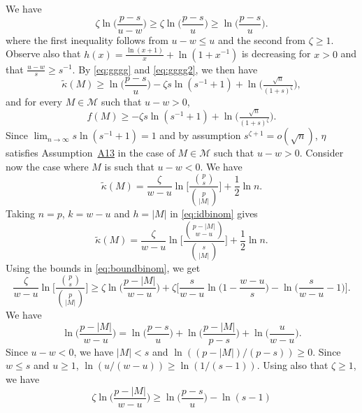 \documentclass[bj,authoryear]{imsart}
\theoremstyle{plain}
\begin{document}
We have
\begin{equation}\label{eq:gggg2}
\zeta\ln\bigg(\frac{p-s}{u-w}\bigg) \geq \zeta\ln\bigg(\frac{p-s}{u}\bigg) \geq \ln\bigg(\frac{p-s}{u}\bigg).\end{equation}
where the first inequality follows from $u-w\leq u$ and the second from $\zeta\geq 1$.
Observe also that $h(x)= \frac{\ln(x+1)}{x}+\ln(1+{x}^{-1})$ is decreasing for $x>0$ and that $\frac{u-w}{s} \geq s^{-1}$. By \eqref{eq:gggg} and \eqref{eq:gggg2}, we then have 
\begin{equation*}
        \tilde{\kappa}(M) \geq \ln\big(\frac{p-s}{u}\big)-\zeta s\ln(s^{-1}+1)+ \ln \big(\tfrac{\sqrt{n}}{(1+s)^{\zeta}}\big),
\end{equation*}
and for every $M\in\mathcal{M}$ such that $u-w>0$,
\begin{equation}\label{eq:lowerboundb1ebic2}
        f(M) \geq -\zeta s\ln(s^{-1}+1)+ \ln \big(\tfrac{\sqrt{n}}{(1+s)^{\zeta}}\big).
\end{equation}
Since $\lim_{n\to\infty}s\ln(s^{-1}+1)=1$ and by assumption $s^{\zeta+1}=o(\sqrt{n})$, $\eta$ satisfies Assumption~\hyperlink{lab:A13}{A13} in the case of $M\in\mathcal{M}$ such that $u-w>0$.
Consider now the case where $M$ is such that $u-w<0$. We have
     \begin{equation*}
        \tilde{\kappa}(M)=\frac{\zeta}{w-u}\ln\bigg[\frac{\binom{p}{s}}{\binom{p}{|M|}}\bigg]+ \frac{1}{2}\ln n.
    \end{equation*}
 Taking $n=p$, $k=w-u$ and $h=|M|$ in \eqref{eq:idbinom} gives
     \begin{equation}\label{eq:identitybinom2}
     \tilde{\kappa}(M)=\frac{\zeta}{w-u}\ln\bigg[\frac{\binom{p - |M|}{w-u}}{\binom{s}{|M|}}\bigg]+ \frac{1}{2}\ln n.
    \end{equation}
Using the bounds in \eqref{eq:boundbinom}, we get
\begin{equation}\label{eq:PVnk}
    \frac{\zeta}{w-u}\ln\bigg[\frac{\binom{p}{s}}{\binom{p}{|M|}}\bigg] \geq \zeta\ln\bigg(\frac{p-|M|}{w-u}\bigg)+\zeta\bigg[\frac{s}{w-u}\ln\bigg(1-\frac{w-u}{s}\bigg) -\ln\bigg(\frac{s}{w-u}-1\bigg) \bigg].
\end{equation}
We have
$$\ln\bigg(\frac{p-|M|}{w-u}\bigg)=\ln\bigg(\frac{p-s}{u}\bigg)+\ln\bigg(\frac{p-|M|}{p-s}\bigg)+\ln\bigg(\frac{u}{w-u}\bigg).$$
Since $u-w<0$, we have $|M|<s$ and $\ln((p-|M|)/(p-s))\geq 0$. Since $w\leq s$ and $u\geq 1$, $\ln(u/(w-u))\geq\ln(1/(s-1))$. Using also that $\zeta\geq 1$, we have
\begin{equation}\label{eq:feIH}
    \zeta\ln\bigg(\frac{p-|M|}{w-u}\bigg) \geq \ln\bigg(\frac{p-s}{u}\bigg) - \ln(s-1)
\end{equation}
\end{document}

